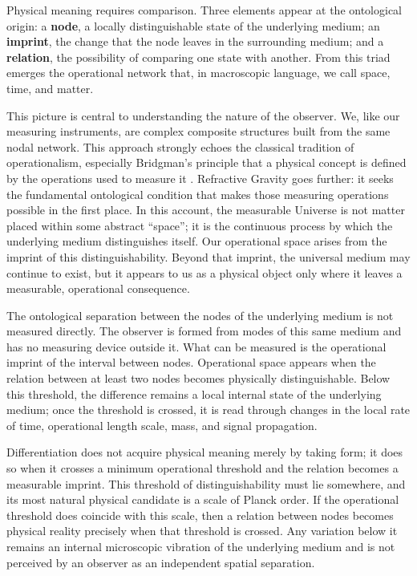 \documentclass[11pt,a4paper]{article}
\begin{document}
Physical meaning requires comparison. Three elements appear at the ontological origin: a \textbf{node}, a locally distinguishable state of the underlying medium; an \textbf{imprint}, the change that the node leaves in the surrounding medium; and a \textbf{relation}, the possibility of comparing one state with another. From this triad emerges the operational network that, in macroscopic language, we call space, time, and matter.

This picture is central to understanding the nature of the observer. We, like our measuring instruments, are complex composite structures built from the same nodal network. This approach strongly echoes the classical tradition of operationalism, especially Bridgman's principle that a physical concept is defined by the operations used to measure it \citep{bridgman1927}. Refractive Gravity goes further: it seeks the fundamental ontological condition that makes those measuring operations possible in the first place. In this account, the measurable Universe is not matter placed within some abstract ``space''; it is the continuous process by which the underlying medium distinguishes itself. Our operational space arises from the imprint of this distinguishability. Beyond that imprint, the universal medium may continue to exist, but it appears to us as a physical object only where it leaves a measurable, operational consequence.

The ontological separation between the nodes of the underlying medium is not measured directly. The observer is formed from modes of this same medium and has no measuring device outside it. What can be measured is the operational imprint of the interval between nodes. Operational space appears when the relation between at least two nodes becomes physically distinguishable. Below this threshold, the difference remains a local internal state of the underlying medium; once the threshold is crossed, it is read through changes in the local rate of time, operational length scale, mass, and signal propagation.

Differentiation does not acquire physical meaning merely by taking form; it does so when it crosses a minimum operational threshold and the relation becomes a measurable imprint. This threshold of distinguishability must lie somewhere, and its most natural physical candidate is a scale of Planck order. If the operational threshold does coincide with this scale, then a relation between nodes becomes physical reality precisely when that threshold is crossed. Any variation below it remains an internal microscopic vibration of the underlying medium and is not perceived by an observer as an independent spatial separation.
\end{document}
